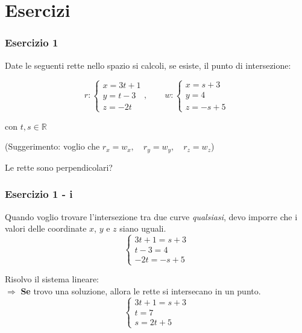 \documentclass{beamer}
\begin{document}
\section{Esercizi}
\begin{frame}
    \frametitle{Esercizio 1}

Date le seguenti rette nello spazio si calcoli, se esiste, il punto di intersezione:

$$
r:\left\{
\begin{array}{l}
x=3t+1\\
y=t-3\\
z= -2t
\end{array}
\right ., \qquad w:\left\{
\begin{array}{l}
x=s+3\\
y=4\\
z=-s+5
\end{array}
\right .
$$

    con $t, s \in \mathbb R$

    (Suggerimento: voglio che $r_x = w_x, \quad r_y = w_y, \quad r_z = w_z$)
    
    \vspace{1cm}
    Le rette sono perpendicolari?

    \end{frame}
    
\begin{frame}
    \frametitle{Esercizio 1 - i}

    Quando voglio trovare l'intersezione tra due curve \textit{qualsiasi}, devo imporre che
    i valori delle coordinate $x$, $y$ e $z$ siano uguali.
$$\left\{\begin{array}{l}
          3t+1=s+3\\
          t-3=4\\
          -2t=-s+5
         \end{array}\right.
$$

    Risolvo il sistema lineare: \\
        $\Rightarrow$ \textbf{Se} trovo una soluzione, allora le rette si intersecano in un punto.
$$
    \left\{\begin{array}{l}
          3t+1=s+3\\
          t=7\\
          s=2t+5
         \end{array}\right . 
$$
\end{frame}
\end{document}
